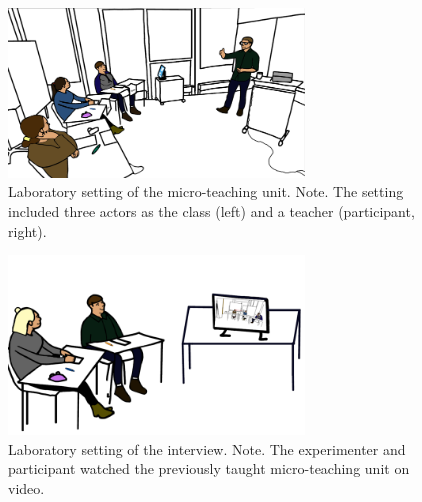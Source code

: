\documentclass[preprint, 3p,
authoryear]{elsarticle} %
\begin{document}
\begin{figure}[htbp]
  \centering
  \includegraphics[width=0.7\textwidth]{appendix_figure1.png}
  \caption{Laboratory setting of the micro-teaching unit. Note. The setting included three actors as the class (left) and a teacher (participant, right).}
  \label{micro-teaching}
\end{figure}

\begin{figure}[htbp]
  \centering
  \includegraphics[width=0.7\textwidth]{appendix_figure2.png}
  \caption{Laboratory setting of the interview. Note. The experimenter and participant watched the previously taught micro-teaching unit on video.}
  \label{laboratory}
\end{figure}
\end{document}
